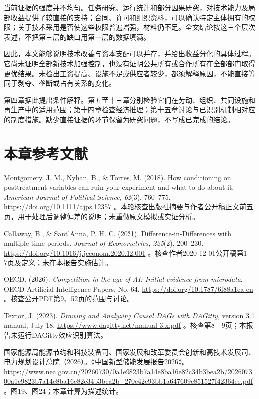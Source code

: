 \documentclass[UTF8,fontset=windows,12pt,a4paper,oneside,openany]{ctexbook}
\begin{document}
当前证据的强度并不均匀。任务研究、运行统计和部分因果研究，对技术能力及局部收益提供了较直接的支持；合同、许可和组织资料，可以确认特定主体拥有的权限；关于技术采用是否使这些权限普遍增强，材料仍不足。全文结论按这三个层次表述，不把第三层的缺口用第一层的数据填满。

因此，本文能够说明技术改善与资本支配可以并存，并给出收益分化的具体过程。它尚未证明全部新技术加强控制，也没有证明公共所有或合作所有在全部部门取得更优结果。未检出工资提高、设施不足或供应者较少，都须解释原因，不能直接等同于剥夺、垄断或占有关系的变化。

第四章据此提出条件解释。第五至十三章分别检验它们在劳动、组织、共同设施和再生产中的适用范围；第十四章检查经济推理；第十五章讨论与已识别机制相对应的制度措施。缺少直接证据的环节保留为研究问题，不写成已完成的结论。

\section*{本章参考文献}

Montgomery, J. M., Nyhan, B., \& Torres, M. (2018). How conditioning on posttreatment variables can ruin your experiment and what to do about it. \emph{American Journal of Political Science, 62}(3), 760–775. \url{https://doi.org/10.1111/ajps.12357} 。本轮核查出版社摘要与作者公开稿正文前五页，用于处理后调整偏差的说明；未重做原文模拟或实证分析。

Callaway, B., \& Sant’Anna, P. H. C. (2021). Difference-in-Differences with multiple time periods. \emph{Journal of Econometrics, 225}(2), 200–230. \url{https://doi.org/10.1016/j.jeconom.2020.12.001} 。核查作者2020-12-01公开稿第1—7页及定义；未在本报告实施估计。

OECD. (2026). \emph{Competition in the age of AI: Initial evidence from microdata}. OECD Artificial Intelligence Papers, No. 64. \url{https://doi.org/10.1787/6f88a1ea-en} 。核查公开PDF第9、52页的范围与讨论。

Textor, J. (2023). \emph{Drawing and Analyzing Causal DAGs with DAGitty}, version 3.1 manual, July 18. \url{https://www.dagitty.net/manual-3.x.pdf} 。核查第8—9页；本报告未运行DAGitty效应识别算法。


国家能源局能源节约和科技装备司、国家发展和改革委员会创新和高技术发展司、电力规划设计总院（2026）。《中国新型储能发展报告2026》。\url{https://www.nea.gov.cn/20260730/0a1e9823b7a14e8ba16e82c34b3bea2b/202607300a1e9823b7a14e8ba16e82c34b3bea2b_270e42e93bb1a647609c851527f42364ee.pdf} 。图19、图24；本章计算为描述统计。
\end{document}
